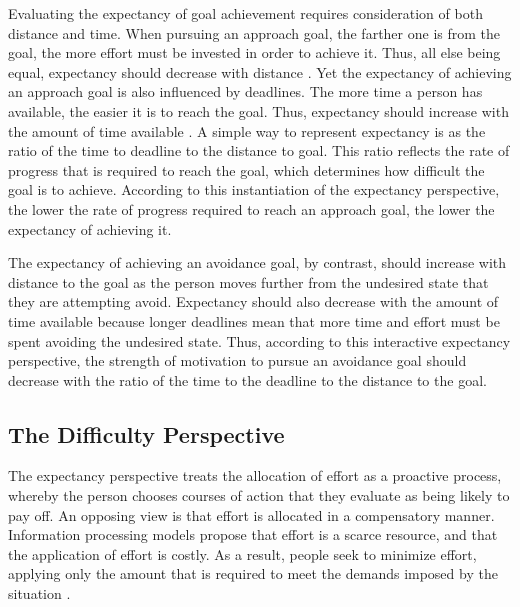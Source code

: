 \documentclass[a4paper,doc,natbib,donotrepeattitle]{apa6}
\begin{document}
Evaluating the expectancy of goal achievement requires consideration of both distance and time. When pursuing an approach goal, the farther one is from the goal, the more effort must be invested in order to achieve it. Thus, all else being equal, expectancy should decrease with distance \citep{Liberman2008}. Yet the expectancy of achieving an approach goal is also influenced by deadlines. The more time a person has available, the easier it is to reach the goal. Thus, expectancy should increase with the amount of time available \citep{Vancouver2010}. A simple way to represent expectancy is as the ratio of the time to deadline to the distance to goal. This ratio reflects the rate of progress that is required to reach the goal, which determines how difficult the goal is to achieve. According to this instantiation of the expectancy perspective, the lower the rate of progress required to reach an approach goal, the lower the expectancy of achieving it.



The expectancy of achieving an avoidance goal, by contrast, should increase with distance to the goal as the person moves further from the undesired state that they are attempting avoid. Expectancy should also decrease with the amount of time available because longer deadlines mean that more time and effort must be spent avoiding the undesired state. Thus, according to this interactive expectancy perspective, the strength of motivation to pursue an avoidance goal should decrease with the ratio of the time to the deadline to the distance to the goal.

\subsection{The Difficulty Perspective}

The expectancy perspective treats the allocation of effort as a proactive process, whereby the person chooses courses of action that they evaluate as being likely to pay off. An opposing view is that effort is allocated in a compensatory manner. Information processing models \citep{Hendy1997,Hockey1997} propose that effort is a scarce resource, and that the application of effort is costly. As a result, people seek to minimize effort, applying only the amount that is required to meet the demands imposed by the situation \citep{Kool2010,Westbrook2015}.
\end{document}
